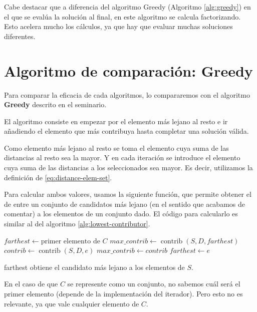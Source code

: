 \documentclass{article}
\begin{document}
Cabe destacar que a diferencia del algoritmo Greedy (Algoritmo \ref{alg:greedy}) en el que se evalúa la solución al final,
en este algoritmo se calcula factorizando. Esto acelera mucho los cálculos, ya que hay que evaluar muchas soluciones diferentes.

\pagebreak

\section{Algoritmo de comparación: Greedy}

Para comparar la eficacia de cada algoritmos, lo compararemos con el algoritmo \textbf{Greedy} descrito en el seminario.

El algoritmo consiste en empezar por el elemento más lejano al resto e ir añadiendo el elemento que más contribuya hasta completar una solución
válida.

Como elemento más lejano al resto se toma el elemento cuya suma de las distancias al resto sea la mayor. Y en cada iteración se introduce el elemento
cuya suma de las distancias a los seleccionados sea mayor. Es decir, utilizamos la definición de \eqref{eq:distance-elem-set}.

Para calcular ambos valores, usamos la siguiente función, que permite obtener el de entre
un conjunto de candidatos más lejano (en el sentido que acabamos de comentar) a los elementos de un conjunto dado.
El código para calcularlo es similar al del algoritmo \ref{alg:lowest-contributor}.

 \begin{algorithm}[H]
	\DontPrintSemicolon %
	$farthest \gets \text{primer elemento de } C$\;
	$max\_contrib \gets \operatorname{contrib}(S,D,farthest)$\;
	 {
		$contrib \gets \operatorname{contrib}(S,D,e)$\;
		 { 
			$max\_contrib \gets contrib$\;
			$farthest \gets e$ 
		}
	}
	\;
	\caption{{\sc farthest} obtiene el candidato más lejano a los elementos de $S$.}
	\label{alg:farthest-candidate-set}
\end{algorithm}

En el caso de que $C$ se represente como un conjunto, no sabemos cuál será el primer elemento (depende de la implementación del iterador). Pero
esto no es relevante, ya que vale cualquier elemento de $C$.
\end{document}
